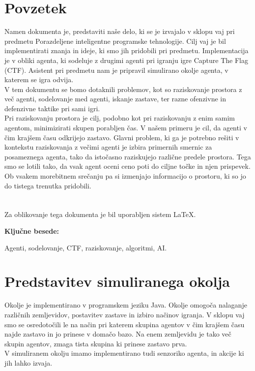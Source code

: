 \documentclass[12pt,a4paper,openany]{book}
\begin{document}
\chapter*{Povzetek}

Namen dokumenta je, predstaviti naše delo, ki se je izvajalo v sklopu vaj pri predmetu
 Porazdeljene inteligentne programske tehnologije. Cilj vaj je bil implementirati znanja
 in ideje, ki smo jih pridobili pri predmetu. Implementacija je v obliki agenta, ki sodeluje
 z drugimi agenti pri igranju igre Capture The Flag (CTF). Asistent pri predmetu nam je pripravil
 simulirano okolje agenta, v katerem se igra odvija.
\\
V tem dokumentu se bomo dotaknili problemov, kot so raziskovanje prostora z več agenti, sodelovanje med agenti, 
iskanje zastave, ter razne ofenzivne in defenzivne taktike pri sami igri.
\\
Pri raziskovanju prostora je cilj, podobno kot pri raziskovanju z enim samim agentom, minimizirati skupen porabljen čas.
 V našem primeru je cil, da agenti v čim krajšem času odkrijejo zastavo. Glavni problem, ki ga je potrebno rešiti v kontekstu
 raziskovanja z večimi agenti je izbira primernih smernic za posameznega agenta, tako da istočasno raziskujejo različne predele 
prostora. Tega smo se lotili tako, da vsak agent oceni ceno poti do ciljne točke in njen prispevek. Ob vsakem morebitnem srečanju 
pa si izmenjajo informacijo o prostoru, ki so jo do tistega trenutka pridobili.\\
\\
\\
Za oblikovanje tega dokumenta je bil uporabljen sistem \LaTeX.

\vspace{1.3cm}
\noindent
{\large \bf Ključne besede:}

\vspace{0.5cm}
\noindent
Agenti, sodelovanje, CTF, raziskovanje, algoritmi, AI.




\chapter{Predstavitev simuliranega okolja}
Okolje je implementirano v programskem jeziku Java. Okolje omogoča nalaganje različnih zemljevidov,
 postavitev zastave in izbiro načinov igranja. V sklopu vaj smo se osredotočili le na način pri katerem
 skupina agentov v čim krajšem času najde zastavo in jo prinese v domačo bazo. Na enem zemljevidu je tako
 več skupin agentov, zmaga tista skupina ki prinese zastavo prva.
\\
V simuliranem okolju imamo implementirano tudi senzoriko agenta, in akcije ki jih lahko izvaja.
\end{document}
